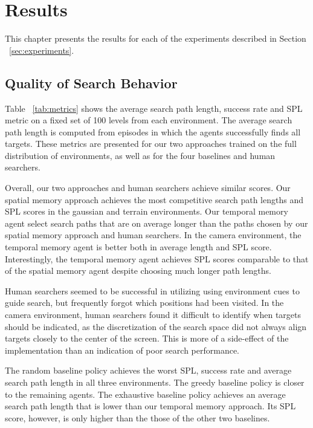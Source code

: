 \chapter{Results}
\label{cha:results}

This chapter presents the results for each of the experiments described in Section ~\ref{sec:experiments}.

\section{Quality of Search Behavior}

Table ~\ref{tab:metrics} shows the average search path length, success rate and SPL metric on a fixed set of 100 levels from each environment.
The average search path length is computed from episodes in which the agents successfully finds all targets.
These metrics are presented for our two approaches trained on the full distribution of environments, as well as for the four baselines and human searchers.

Overall, our two approaches and human searchers achieve similar scores.
Our spatial memory approach achieves the most competitive search path lengths and SPL scores in the gaussian and terrain environments.
Our temporal memory agent select search paths that are on average longer than the paths chosen by our spatial memory approach and human searchers.
In the camera environment, the temporal memory agent is better both in average length and SPL score.
Interestingly, the temporal memory agent achieves SPL scores comparable to that of the spatial memory agent despite choosing much longer path lengths.

Human searchers seemed to be successful in utilizing using environment cues to guide search, but frequently forgot which positions had been visited.
In the camera environment, human searchers found it difficult to identify when targets should be indicated,
as the discretization of the search space did not always align targets closely to the center of the screen.
This is more of a side-effect of the implementation than an indication of poor search performance.

The random baseline policy achieves the worst SPL, success rate and average search path length in all three environments.
The greedy baseline policy is closer to the remaining agents.
The exhaustive baseline policy achieves an average search path length that is lower than our temporal memory approach.
Its SPL score, however, is only higher than the those of the other two baselines.

